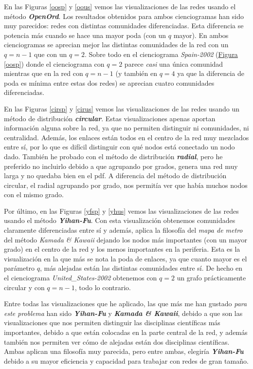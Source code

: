 \documentclass[10pt,a4paper,spanish]{article}
\numberwithin{equation}{section} %
\numberwithin{figure}{section} %
\numberwithin{table}{section} %
\begin{document}
En las Figuras \hyperref[oosp]{\ref*{oosp}} y \hyperref[oous]{\ref*{oous}} vemos las visualizaciones de las redes usando el método \textit{\textbf{OpenOrd}}. Los resultados obtenidos para ambos cienciogramas han sido muy parecidos: redes con distintas comunidades diferenciadas. Esta diferencia se potencia más cuando se hace una mayor poda (con un $q$ mayor). En ambos cienciogramas se aprecian mejor las distintas comunidades de la red con un $q = n-1$ que con un $q = 2$. Sobre todo en el cienciograma \textit{Spain-2002} (\hyperref[oosp]{Figura \ref*{oosp}}) donde el cienciograma con $q=2$ parece \textit{casi} una única comunidad mientras que en la red con $q = n-1$ (y también en $q = 4$ ya que la diferencia de poda es mínima entre estas dos redes) se aprecian cuatro comunidades diferenciadas.

En las Figuras \hyperref[cirsp]{\ref*{cirsp}} y \hyperref[cirus]{\ref*{cirus}} vemos las visualizaciones de las redes usando un método de distribución \textit{\textbf{circular}}. Estas visualizaciones apenas aportan información alguna sobre la red, ya que no permiten distinguir ni comunidades, ni centralidad. Además, los enlaces están todos en el centro de la red muy mezclados entre sí, por lo que es difícil distinguir con qué nodos está conectado un nodo dado. También he probado con el método de distribución \textit{\textbf{radial}}, pero he preferido no incluirlo debido a que agrupando por grados, genera una red muy larga y no quedaba bien en el pdf. A diferencia del método de distribución circular, el radial agrupando por grado, nos permitía ver que había muchos nodos con el mismo grado.

Por último, en las Figuras \hyperref[yfsp]{\ref*{yfsp}} y \hyperref[yhus]{\ref*{yhus}} vemos las visualizaciones de las redes usando el método \textit{\textbf{Yihan-Fu}}. Con esta visualización obtenemos comunidades claramente diferenciadas entre sí y además, aplica la filosofía del \textit{mapa de metro} del método \textit{Kamada \& Kawaii} dejando los nodos más importantes (con un mayor grado) en el centro de la red y los menos importantes en la periferia. Esta es la visualización en la que más se nota la poda de enlaces, ya que cuanto mayor es el parámetro $q$, más alejadas están las distintas comunidades entre sí. De hecho en el cienciograma \textit{United\_States-2002} obtenemos con $q = 2$ un grafo prácticamente circular y con $q = n-1$, todo lo contrario.

Entre todas las visualizaciones que he aplicado, las que más me han gustado \textit{para este problema} han sido \textbf{\textit{Yihan-Fu}} y \textit{\textbf{Kamada \& Kawaii}}, debido a que son las visualizaciones que nos permiten distinguir las disciplinas científicas más importantes, debido a que están colocadas en la parte central de la red, y además también nos permiten ver cómo de alejadas están dos disciplinas científicas. Ambas aplican una filosofía muy parecida, pero entre ambas, elegiría \textit{\textbf{Yihan-Fu}} debido a su mayor eficiencia y capacidad para trabajar con redes de gran tamaño.
\end{document}
